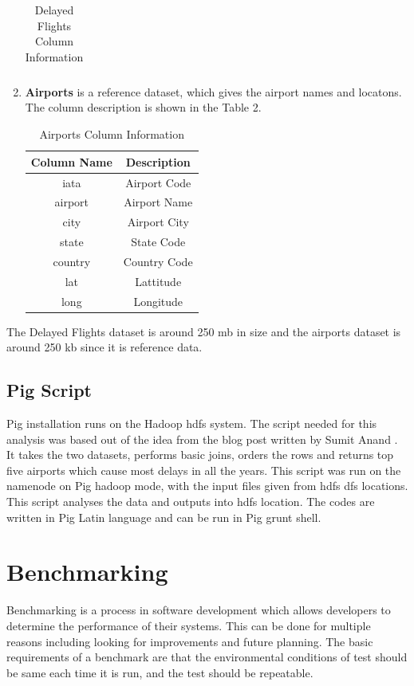 \documentclass[9pt,twocolumn,twoside]{../../styles/osajnl}
\begin{document}
\begin{enumerate}
\begin{table}
\begin{tabular}{|c|c|}
    \end{tabular}
    \caption{Delayed Flights Column Information}
    \end{table}
    \item \textbf{Airports} is a reference dataset, which gives the airport names and locatons. The column description is shown in the Table 2.
    
    \begin{table}
    \begin{tabular}{|c|c|}
        \hline
        \textbf{Column Name} & \textbf{Description} \\ \hline
        iata & Airport Code  \\ \hline
        airport & Airport Name  \\ \hline
        city & Airport City  \\ \hline
        state & State Code  \\ \hline
        country & Country Code  \\ \hline
        lat & Lattitude  \\ \hline
    long & Longitude  \\ \hline
    \end{tabular}
    \caption{Airports Column Information}
    \end{table}
    
\end{enumerate}
The Delayed Flights dataset is around 250 mb in size and the airports dataset is around 250 kb since it is reference data.
\subsection{Pig Script}
Pig installation runs on the Hadoop hdfs system. The script needed for this analysis was based out of the idea from the blog post written by Sumit Anand \cite{www-acadguild}. It takes the two datasets, performs basic joins, orders the rows and returns top five airports which cause most delays in all the years. This script was run on the namenode on Pig hadoop mode, with the input files given from hdfs dfs locations. This script analyses the data and outputs into hdfs location. The codes are written in Pig Latin language and can be run in Pig grunt shell. 

\section{Benchmarking}
Benchmarking is a process in software development which allows developers to determine the performance of their systems. This can be done for multiple reasons including looking for improvements and future planning. The basic requirements of a benchmark are that the environmental conditions of test should be same each time it is run, and the test should be repeatable. 
\end{document}
